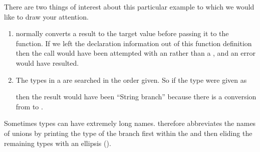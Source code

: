 There are two things of interest about this particular
example to which we would like to draw your attention.
\begin{enumerate}
%
\item \Language{} normally converts a result to the target value
before passing it to the function.
If we left the declaration information out of this function definition
then the  call would have been attempted with an
 rather than a , and an error would have
resulted.
%
\item The types in a  are searched in the order given.
So if the type were given as

\noindent
{\small{}}

\noindent
then the result would have been ``String branch'' because there
is a conversion from  to .
\end{enumerate}

Sometimes  types can have extremely
long names.
\Language{} therefore abbreviates the names of unions by printing
the type of the branch first within the  and then
eliding the remaining types with an ellipsis ().

